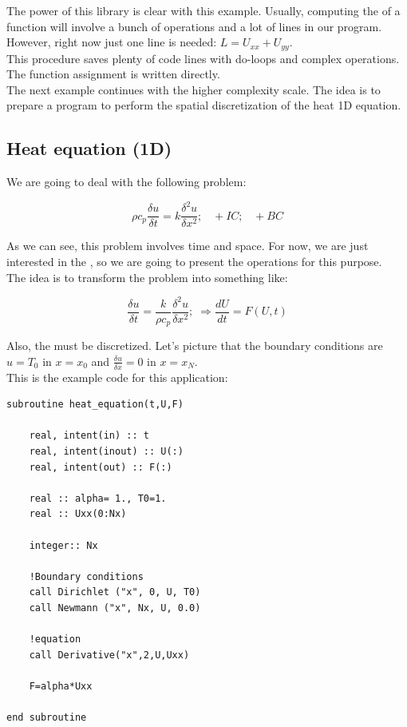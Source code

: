 The power of this library is clear with this example. Usually, computing the
 of a function will involve a bunch of operations and a lot of
lines in our program. However, right now just one line is needed: $L=U_{xx}+U_{yy}$.\\

This procedure saves plenty of code lines with do-loops and complex
operations. The function assignment is written directly.\\

The next example continues with the higher complexity scale. The idea is to
prepare a program to perform the spatial discretization of the heat 1D
equation.\\

\newpage
\subsection{Heat equation (1D)}


We are going to deal with the following problem:

$$
\rho c_p \frac{\delta u}{\delta t}= k \frac{\delta^2 u}{\delta x^2};\;\;\;
+IC; \;\;\; +BC
$$

As we can see, this problem involves time and space. For now, we are just
interested in the , so we are going to present the
operations for this purpose.\\

The idea is to transform the problem into something like: 

$$
\frac{\delta u}{\delta t}= \frac{k}{\rho c_p} \frac{\delta^2 u}{\delta
x^2};\;\Longrightarrow \frac{dU}{dt}= F(U,t)
$$

Also, the  must be discretized. Let's picture that the
boundary conditions are $u=T_0$ in $x=x_0$ and $\frac{\delta u}{\delta x}=0$ in $x=x_N$.\\

This is the example code for this application:

\begin{blueframed}
\begin{lstlisting}
subroutine heat_equation(t,U,F)

	real, intent(in) :: t
	real, intent(inout) :: U(:)
	real, intent(out) :: F(:)

	real :: alpha= 1., T0=1.
	real :: Uxx(0:Nx)
	
	integer:: Nx
	
	!Boundary conditions
	call Dirichlet ("x", 0, U, T0)
	call Newmann ("x", Nx, U, 0.0)

	!equation
	call Derivative("x",2,U,Uxx)
	
	F=alpha*Uxx
	
end subroutine
	
		
	
\end{lstlisting}
\end{blueframed}

